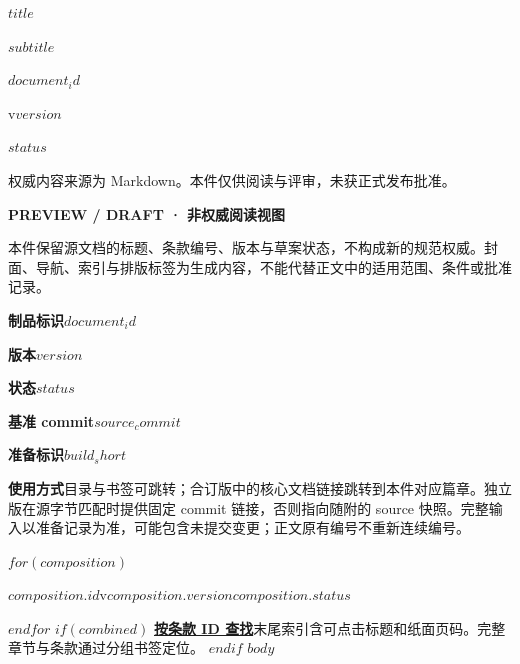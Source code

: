 \documentclass[UTF8,fontset=none,scheme=plain,11pt,a4paper,oneside,openany]{ctexbook}
\begin{document}
\pagestyle{empty}
\pagecolor{PreviewNavy}\color{white}
\vspace*{30mm}
\begin{flushleft}{\sffamily\bfseries\fontsize{29}{38}\selectfont $title$\par}\end{flushleft}
\vspace{8mm}
{\sffamily\large $subtitle$\par}
\vfill
{\sffamily\small $document_id$\par\medskip v$version$\par\medskip $status$\par}
\vspace{10mm}
{\small 权威内容来源为 Markdown。本件仅供阅读与评审，未获正式发布批准。\par}
\clearpage\nopagecolor\color{PreviewInk}\pagestyle{fancy}
\noindent\textbf{PREVIEW / DRAFT · 非权威阅读视图}

本件保留源文档的标题、条款编号、版本与草案状态，不构成新的规范权威。封面、导航、索引与排版标签为生成内容，不能代替正文中的适用范围、条件或批准记录。

\medskip
\noindent\textbf{制品标识}\quad $document_id$\par
\noindent\textbf{版本}\quad $version$\par
\noindent\textbf{状态}\quad $status$\par
\noindent\textbf{基准 commit}\quad\texttt{$source_commit$}\par
\noindent\textbf{准备标识}\quad\texttt{$build_short$}\par
\noindent\textbf{使用方式}\quad 目录与书签可跳转；合订版中的核心文档链接跳转到本件对应篇章。独立版在源字节匹配时提供固定 commit 链接，否则指向随附的 source 快照。完整输入以准备记录为准，可能包含未提交变更；正文原有编号不重新连续编号。

$for(composition)$
\par\noindent\hyperlink{$composition.anchor$}{\textbf{$composition.id$}}\quad v$composition.version$\quad $composition.status$\par
$endfor$
$if(combined)$
\medskip\noindent\hyperlink{generated-requirement-index}{\textbf{按条款 ID 查找}}\quad 末尾索引含可点击标题和纸面页码。完整章节与条款通过分组书签定位。
\setcounter{tocdepth}{-1}
$endif$
\clearpage
\tableofcontents
\clearpage
$body$
\end{document}

